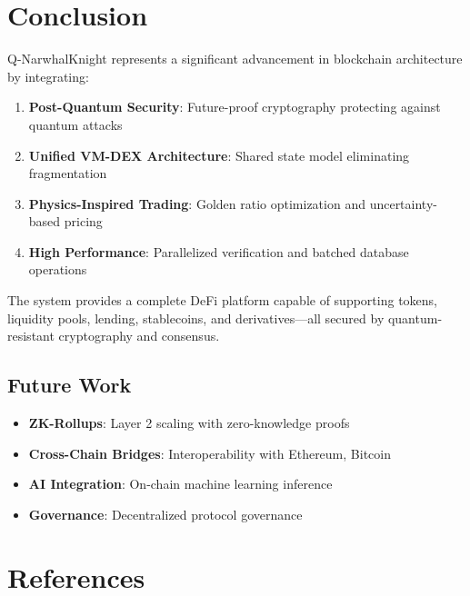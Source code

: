 \documentclass[11pt,a4paper]{article}
\begin{document}
\section{Conclusion}

Q-NarwhalKnight represents a significant advancement in blockchain architecture by integrating:

\begin{enumerate}[leftmargin=*]
    \item \textbf{Post-Quantum Security}: Future-proof cryptography protecting against quantum attacks
    \item \textbf{Unified VM-DEX Architecture}: Shared state model eliminating fragmentation
    \item \textbf{Physics-Inspired Trading}: Golden ratio optimization and uncertainty-based pricing
    \item \textbf{High Performance}: Parallelized verification and batched database operations
\end{enumerate}

The system provides a complete DeFi platform capable of supporting tokens, liquidity pools, lending, stablecoins, and derivatives---all secured by quantum-resistant cryptography and consensus.

\subsection{Future Work}

\begin{itemize}[leftmargin=*]
    \item \textbf{ZK-Rollups}: Layer 2 scaling with zero-knowledge proofs
    \item \textbf{Cross-Chain Bridges}: Interoperability with Ethereum, Bitcoin
    \item \textbf{AI Integration}: On-chain machine learning inference
    \item \textbf{Governance}: Decentralized protocol governance
\end{itemize}

\section*{References}
\end{document}
